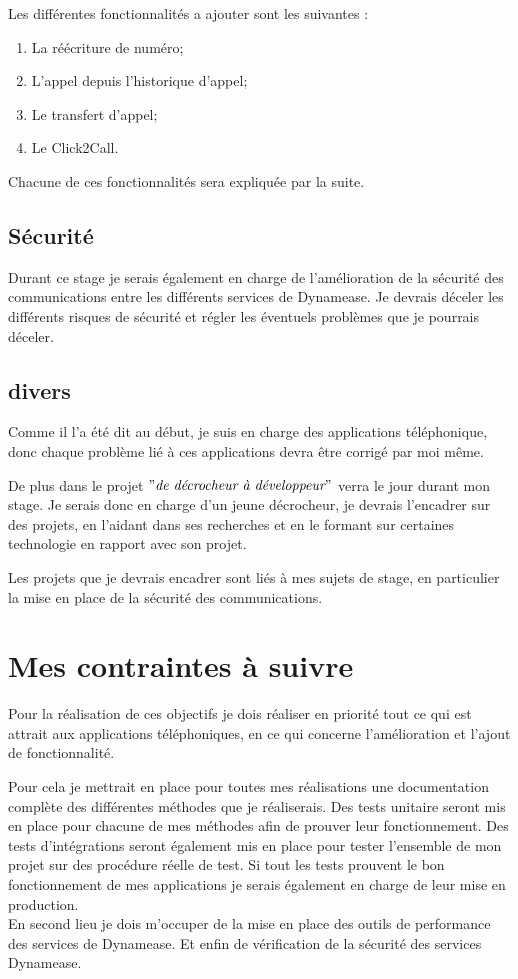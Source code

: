 Les différentes fonctionnalités a ajouter sont les suivantes :

\begin{enumerate}
	\item La réécriture de numéro;
	\item L'appel depuis l'historique d'appel;
	\item Le transfert d'appel;
	\item Le Click2Call.
\end{enumerate}

Chacune de ces fonctionnalités sera expliquée par la suite.

\subsection{Sécurité}

Durant ce stage je serais également en charge de l'amélioration de la sécurité des communications entre les différents services de Dynamease. Je devrais déceler les différents risques de sécurité et régler les éventuels problèmes que je pourrais déceler.

\subsection{divers}

Comme il l'a été dit au début, je suis en charge des applications téléphonique, donc chaque problème lié à ces applications devra être corrigé par moi même.

De plus dans le projet $"\textit{de décrocheur à développeur}"$ verra le jour durant mon stage. Je serais donc en charge d'un jeune décrocheur, je devrais l'encadrer sur des projets, en l'aidant dans ses recherches et en le formant sur certaines technologie en rapport avec son projet.

Les projets que je devrais encadrer sont liés à mes sujets de stage, en particulier la mise en place de la sécurité des communications.

\section{Mes contraintes à suivre}

Pour la réalisation de ces objectifs je dois réaliser en priorité tout ce qui est attrait aux applications téléphoniques, en ce qui concerne l'amélioration et l'ajout de fonctionnalité.

Pour cela je mettrait en place pour toutes mes réalisations une documentation complète des différentes méthodes que je réaliserais. Des tests unitaire seront mis en place pour chacune de mes méthodes afin de prouver leur fonctionnement. Des tests d'intégrations seront également mis en place pour tester l'ensemble de mon projet sur des procédure réelle de test. Si tout les tests prouvent le bon fonctionnement de mes applications je serais également en charge de leur mise en production.\\

En second lieu je dois m'occuper de la mise en place des outils de performance des services de Dynamease. Et enfin de vérification de la sécurité des services Dynamease.